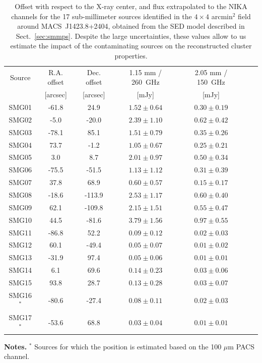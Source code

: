 \documentclass[twocolumn,traditabstract]{aa}
\begin{document}
\begin{table}[h]
\caption{\footnotesize Offset with respect to the X-ray center, and flux extrapolated to the NIKA channels for the 17 sub-millimeter sources identified in the $4 \times 4$ arcmin$^2$ field around \mbox{MACS~J1423.8+2404}, obtained from the SED model described in Sect.~\ref{sec:smmps}. Despite the large uncertainties, these values allow to us estimate the impact of the contaminating sources on the reconstructed cluster properties.}
\begin{center}
\begin{tabular}{ccccccc}
\hline
\hline
Source &  R.A. offset & Dec. offset & 1.15 mm / 260~GHz & 2.05 mm / 150~GHz\\
 &  [arcsec] & [arcsec] & [mJy] & [mJy] \\
\hline
SMG01 &    -61.8 &     24.9 & $    1.52 \pm     0.64$ & $    0.30 \pm     0.19$ \\
SMG02 &     -5.0 &    -20.0 & $    2.39 \pm     1.10$ & $    0.62 \pm     0.42$ \\
SMG03 &    -78.1 &     85.1 & $    1.51 \pm     0.79$ & $    0.35 \pm     0.26$ \\
SMG04 &     73.7 &     -1.2 & $    1.05 \pm     0.67$ & $    0.25 \pm     0.21$ \\
SMG05 &      3.0 &      8.7 & $    2.01 \pm     0.97$ & $    0.50 \pm     0.34$ \\
SMG06 &    -75.5 &    -51.5 & $    1.13 \pm     1.12$ & $    0.31 \pm     0.39$ \\
SMG07 &     37.8 &     68.9 & $    0.60 \pm     0.57$ & $    0.15 \pm     0.17$ \\
SMG08 &    -18.6 &   -113.9 & $    2.53 \pm     1.17$ & $    0.60 \pm     0.40$ \\
SMG09 &     62.1 &   -109.8 & $    2.15 \pm     1.51$ & $    0.55 \pm     0.47$ \\
SMG10 &     44.5 &    -81.6 & $    3.79 \pm     1.56$ & $    0.97 \pm     0.55$ \\
SMG11 &    -86.8 &     52.2 & $    0.09 \pm     0.12$ & $    0.02 \pm     0.03$ \\
SMG12 &     60.1 &    -49.4 & $    0.05 \pm     0.07$ & $    0.01 \pm     0.02$ \\
SMG13 &    -31.9 &     97.4 & $    0.05 \pm     0.06$ & $    0.01 \pm     0.01$ \\
SMG14 &      6.1 &     69.6 & $    0.14 \pm     0.23$ & $    0.03 \pm     0.06$ \\
SMG15 &     93.8 &     28.7 & $    0.13 \pm     0.28$ & $    0.03 \pm     0.07$ \\
SMG16$^*$ &    -80.6 &    -27.4 & $    0.08 \pm     0.11$ & $    0.02 \pm     0.03$ \\
SMG17$^*$ &    -53.6 &     68.8 & $    0.03 \pm     0.04$ & $    0.01 \pm     0.01$ \\
\hline
\end{tabular}
\end{center}
{\small {\bf Notes.} $^*$ Sources for which the position is estimated based on the 100 $\mu$m PACS channel.}
\label{tab:IR_ps2}
\end{table}
\end{document}
